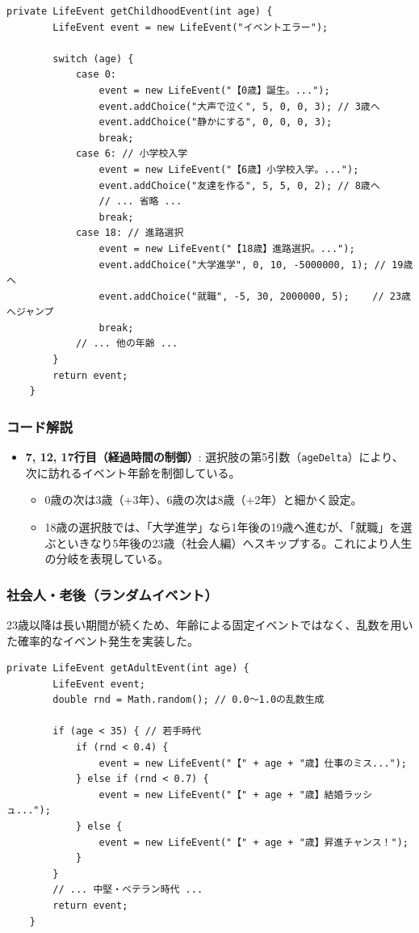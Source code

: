\documentclass[a4paper,11pt]{jsarticle}
\begin{document}
\begin{lstlisting}[caption=GameLogic.java（子供時代）, label=code:gamelogic_child]
    private LifeEvent getChildhoodEvent(int age) {
        LifeEvent event = new LifeEvent("イベントエラー");

        switch (age) {
            case 0:
                event = new LifeEvent("【0歳】誕生。...");
                event.addChoice("大声で泣く", 5, 0, 0, 3); // 3歳へ
                event.addChoice("静かにする", 0, 0, 0, 3);
                break;
            case 6: // 小学校入学
                event = new LifeEvent("【6歳】小学校入学。...");
                event.addChoice("友達を作る", 5, 5, 0, 2); // 8歳へ
                // ... 省略 ...
                break;
            case 18: // 進路選択
                event = new LifeEvent("【18歳】進路選択。...");
                event.addChoice("大学進学", 0, 10, -5000000, 1); // 19歳へ
                event.addChoice("就職", -5, 30, 2000000, 5);    // 23歳へジャンプ
                break;
            // ... 他の年齢 ...
        }
        return event;
    }
\end{lstlisting}

\subsubsection*{コード解説}
\begin{itemize}
    \item \textbf{7, 12, 17行目（経過時間の制御）}: 選択肢の第5引数（\texttt{ageDelta}）により、次に訪れるイベント年齢を制御している。
    \begin{itemize}
        \item 0歳の次は3歳（+3年）、6歳の次は8歳（+2年）と細かく設定。
        \item 18歳の選択肢では、「大学進学」なら1年後の19歳へ進むが、「就職」を選ぶといきなり5年後の23歳（社会人編）へスキップする。これにより人生の分岐を表現している。
    \end{itemize}
\end{itemize}

\subsubsection{社会人・老後（ランダムイベント）}
23歳以降は長い期間が続くため、年齢による固定イベントではなく、乱数を用いた確率的なイベント発生を実装した。

\begin{lstlisting}[caption=GameLogic.java（社会人時代）, label=code:gamelogic_adult]
    private LifeEvent getAdultEvent(int age) {
        LifeEvent event;
        double rnd = Math.random(); // 0.0〜1.0の乱数生成

        if (age < 35) { // 若手時代
            if (rnd < 0.4) {
                event = new LifeEvent("【" + age + "歳】仕事のミス...");
            } else if (rnd < 0.7) {
                event = new LifeEvent("【" + age + "歳】結婚ラッシュ...");
            } else {
                event = new LifeEvent("【" + age + "歳】昇進チャンス！");
            }
        } 
        // ... 中堅・ベテラン時代 ...
        return event;
    }
\end{lstlisting}
\end{document}

